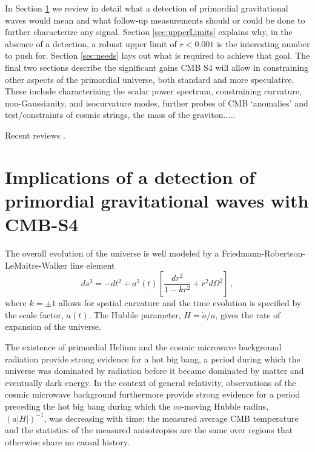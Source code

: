 In Section \ref{sec:detection} we review in detail what a detection of primordial gravitational waves would mean and what follow-up measurements should or could be done to further characterize any signal. Section \ref{sec:upperLimits} explains why, in the absence of a detection, a robust upper limit of $r<0.001$ is the interesting number to push for. Section \ref{sec:needs} lays out what is required to achieve that goal. The final two sections describe the significant gains CMB S4 will allow in constraining other aspects of the primordial universe, both standard and more speculative. These include characterizing the scalar power spectrum, constraining curvature, non-Gaussianity, and isocurvature modes, further probes of CMB `anomalies' and test/constraints of cosmic strings, the mass of the graviton.....
 
Recent reviews \cite{Kamionkowski:2015yta}.

\section{Implications of a detection of primordial gravitational waves with CMB-S4}
\label{sec:detection}
The overall evolution of the universe is well modeled by a Friedmann-Robertson-LeMaitre-Walker line element
\begin{equation}
ds^2=-dt^2+a^2(t)\left[\frac{dr^2}{1-kr^2}+r^2d\Omega^2\right]\,,
\end{equation}
where $k=\pm1$ allows for spatial curvature and the time evolution is specified by the scale factor, $a(t)$. The Hubble parameter, $H=\dot{a}/a$, gives the rate of expansion of the universe. 

The existence of primordial Helium and the cosmic microwave background radiation provide strong evidence for a hot big bang, a period during which the universe was dominated by radiation before it became dominated by matter and eventually dark energy. In the context of general relativity, observations of the cosmic microwave background furthermore provide strong evidence for a period preceding the hot big bang during which the co-moving Hubble radius, $(a|H|)^{-1}$, was decreasing with time: the measured average CMB temperature and the statistics of the measured anisotropies are the same over regions that otherwise share no causal history. 


